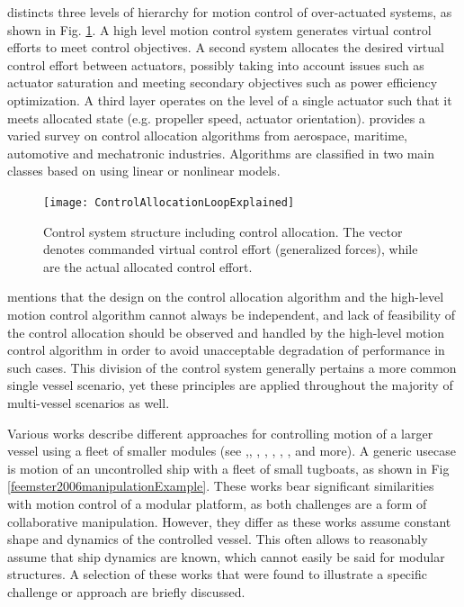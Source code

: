 \citet{johansen2013control} distincts three levels of hierarchy for motion control of over-actuated systems, as shown in Fig. \ref{johansen2013controlDistinction}. A high level motion control system generates virtual control efforts to meet control objectives. A second system allocates the desired virtual control effort between actuators, possibly taking into account issues such as actuator saturation and meeting secondary objectives such as power efficiency optimization. A third layer operates on the level of a single actuator such that it meets allocated state (e.g. propeller speed, actuator orientation). \citet{johansen2013control} provides a varied survey on control allocation algorithms from aerospace, maritime, automotive and mechatronic industries. Algorithms are classified in two main classes based on using linear or nonlinear models. 
	\begin{figure}[h]
		\centering
		\texttt{[image: ControlAllocationLoopExplained]}
		\caption{\citet{johansen2013control} Control system structure including control allocation. The vector  denotes commanded virtual control effort (generalized forces), while  are the actual allocated control effort.}
		\label{johansen2013controlDistinction}
	\end{figure}
\citet{johansen2013control} mentions that the design on the control allocation algorithm and the high-level motion control algorithm cannot always be independent, and lack of feasibility of the control allocation should be observed and handled by the high-level motion control algorithm in order to avoid unacceptable degradation of performance in such cases. This division of the control system generally pertains a more common single vessel scenario, yet these principles are applied throughout the majority of multi-vessel scenarios as well. 

Various works describe different approaches for controlling motion of a larger vessel using a fleet of smaller modules (see 
\citet{feemster2006manipulation},\citet{4282954},  \cite{feemster2011comprehensive},  \citet{smith2007swarn}, \citet{bidikli2016robust}, \citet{esposito2008cooperative}, \citet{du2020cooperative},    
 and more). A generic usecase is motion of an uncontrolled ship with a fleet of small tugboats, as shown in Fig \ref{feemster2006manipulationExample}.  These works bear significant similarities with motion control of a modular platform, as both challenges are a form of collaborative manipulation. However, they differ as these works assume constant shape and dynamics of the controlled vessel. This often allows to reasonably assume that ship dynamics are known, which cannot easily be said for modular structures. A selection of these works that were found to illustrate a specific challenge or approach are briefly discussed. 
	
